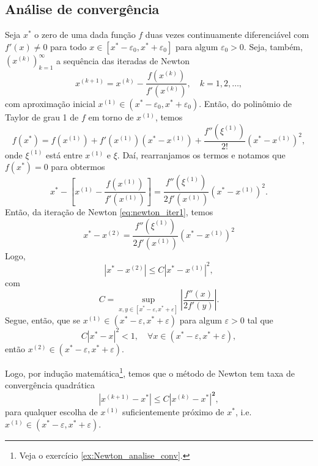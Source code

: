 \subsection{Análise de convergência}

Seja $x^*$ o zero de uma dada função $f$ duas vezes continuamente diferenciável com $f'(x)\neq 0$ para todo $x\in [x^*-\varepsilon_0, x^*+\varepsilon_0]$ para algum $\varepsilon_0>0$. Seja, também, $(x^{(k)})_{k=1}^\infty$ a sequência das iteradas de Newton
\begin{equation}\label{eq:newton_iter1}
  x^{(k+1)} = x^{(k)} - \frac{f(x^{(k)})}{f'(x^{(k)})},\quad k=1, 2, \ldots,
\end{equation}
com aproximação inicial $x^{(1)}\in (x^*-\varepsilon_0, x^*+\varepsilon_0)$. Então, do polinômio de Taylor de grau 1 de $f$ em torno de $x^{(1)}$, temos
\begin{equation}
  f(x^*) = f(x^{(1)}) + f'(x^{(1)})(x^* - x^{(1)}) + \frac{f''(\xi^{(1)})}{2!}(x^*-x^{(1)})^2,
\end{equation}
onde $\xi^{(1)}$ está entre $x^{(1)}$ e $\xi$. Daí, rearranjamos os termos e notamos que $f(x^*)=0$ para obtermos
\begin{equation}
  x^* - \left[x^{(1)} - \frac{f(x^{(1)})}{f'(x^{(1)})}\right] = \frac{f''(\xi^{(1)})}{2f'(x^{(1)})}(x^*-x^{(1)})^2.
\end{equation}
Então, da iteração de Newton \eqref{eq:newton_iter1}, temos
\begin{equation}
  x^* - x^{(2)} = \frac{f''(\xi^{(1)})}{2f'(x^{(1)})}(x^* - x^{(1)})^2
\end{equation}
Logo,
\begin{equation}\label{eq:newton_taxa_1}
  |x^* - x^{(2)}| \leq C |x^* - x^{(1)}|^2,
\end{equation}
com
\begin{equation}
  C = \sup_{x,y\in [x^*-\varepsilon, x^*+\varepsilon]} \left|\frac{f''(x)}{2f'(y)}\right|.
\end{equation}
Segue, então, que se $x^{(1)}\in (x^*-\varepsilon, x^* + \varepsilon)$ para algum $\varepsilon>0$ tal que
\begin{equation}
  C |x^* - x|^2 < 1,\quad\forall x\in (x^*-\varepsilon, x^* + \varepsilon),
\end{equation}
então $x^{(2)}\in (x^*-\varepsilon, x^*+\varepsilon)$.

Logo, por indução matemática\footnote{Veja o exercício \ref{ex:Newton_analise_conv}.}, temos que o método de Newton tem taxa de convergência quadrática
\begin{equation}\label{eq:Newton_taxa_quadratica}
  |x^{(k+1)}-x^*| \leq C|x^{(k)}-x^{*}|^{\pmb{2}},
\end{equation}
para qualquer escolha de $x^{(1)}$ suficientemente próximo de $x^*$, i.e. $x^{(1)}\in (x^*-\varepsilon, x^*+\varepsilon)$.

